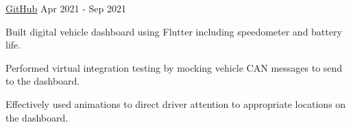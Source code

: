 

\begin{cventries}


  \cventry
    {\href{https://tinyurl.com/daniel-qu-portfolio}{\underline{}}} %
    {\href{https://github.com/uw-midsun/telemetry_xiv}{\underline{GitHub}} \faGithubSquare}
    {}
    {Apr 2021 - Sep 2021} %
    {
      \begin{cvitems} %
        \item {Built digital vehicle dashboard using {Flutter} including speedometer and battery life.}
        \item {Performed virtual {integration testing} by mocking vehicle CAN messages to send to the dashboard.}
        \item {Effectively used animations to direct driver attention to appropriate locations on the dashboard.}
      \end{cvitems}
    }



\end{cventries}
